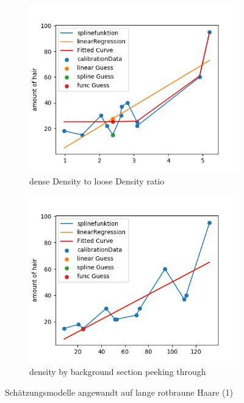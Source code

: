 \documentclass[german,a4paper, 12pt]{scrartcl}
\begin{document}
\begin{figure}[H]
\medskip
\begin{subfigure}{0.48\textwidth}
	\includegraphics[width=1.1\linewidth]{fig64/g05_denseDensitytolooseDensity.png}
	\caption{dense Density to loose Density ratio} \label{fig:e}
\end{subfigure}\hspace*{\fill}
\begin{subfigure}{0.48\textwidth}
	\includegraphics[width=1.1\linewidth]{fig64/g06_densitybybackgorundsections.png}
	\caption{density by background section peeking through} \label{fig:f}
\end{subfigure}


\caption{Schätzungsmodelle angewandt auf lange rotbraune Haare (1)} \label{fig:1}
\end{figure}
\end{document}
